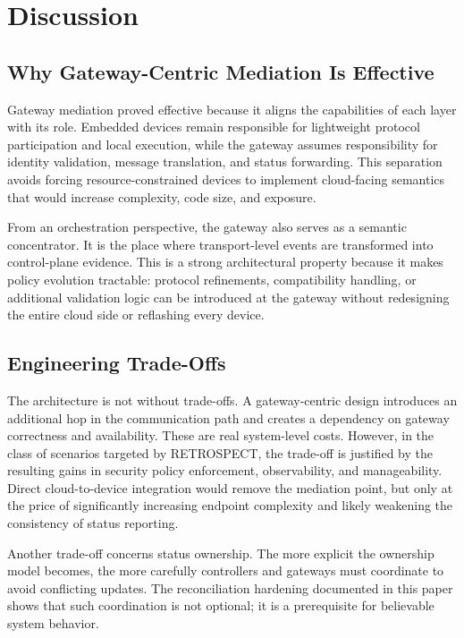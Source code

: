 \section{Discussion}

\subsection{Why Gateway-Centric Mediation Is Effective}
Gateway mediation proved effective because it aligns the capabilities of each layer with its role. Embedded devices remain responsible for lightweight protocol participation and local execution, while the gateway assumes responsibility for identity validation, message translation, and status forwarding. This separation avoids forcing resource-constrained devices to implement cloud-facing semantics that would increase complexity, code size, and exposure.

From an orchestration perspective, the gateway also serves as a semantic concentrator. It is the place where transport-level events are transformed into control-plane evidence. This is a strong architectural property because it makes policy evolution tractable: protocol refinements, compatibility handling, or additional validation logic can be introduced at the gateway without redesigning the entire cloud side or reflashing every device.

\subsection{Engineering Trade-Offs}
The architecture is not without trade-offs. A gateway-centric design introduces an additional hop in the communication path and creates a dependency on gateway correctness and availability. These are real system-level costs. However, in the class of scenarios targeted by RETROSPECT, the trade-off is justified by the resulting gains in security policy enforcement, observability, and manageability. Direct cloud-to-device integration would remove the mediation point, but only at the price of significantly increasing endpoint complexity and likely weakening the consistency of status reporting.

Another trade-off concerns status ownership. The more explicit the ownership model becomes, the more carefully controllers and gateways must coordinate to avoid conflicting updates. The reconciliation hardening documented in this paper shows that such coordination is not optional; it is a prerequisite for believable system behavior.


